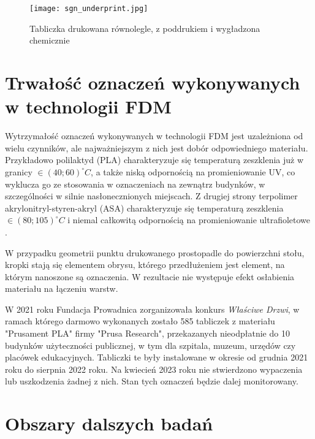 \documentclass[12pt,a4paper]{article}
\begin{document}
\begin{figure}
\texttt{[image: sgn\_underprint.jpg]}
\caption{Tabliczka drukowana równolegle, z poddrukiem i wygładzona chemicznie}
\end{figure}

\section{Trwałość oznaczeń wykonywanych w technologii FDM}
Wytrzymałość oznaczeń wykonywanych w technologii FDM jest uzależniona od wielu czynników, ale najważniejszym z nich jest dobór odpowiedniego materiału.
Przykładowo polilaktyd (PLA) charakteryzuje się temperaturą zeszklenia już w granicy $\in (40; 60)^{\circ} C$, a także niską odpornością na promieniowanie UV, co wyklucza go ze stosowania w oznaczeniach na zewnątrz budynków, w szczególności w silnie nasłonecznionych miejscach. Z drugiej strony terpolimer akrylonitryl-styren-akryl (ASA) charakteryzuje się temperaturą zeszklenia $\in (80; 105)^{\circ} C$ i niemal całkowitą odpornością na promieniowanie ultrafioletowe \cite{plaabsasa}.

W przypadku geometrii punktu drukowanego prostopadle do powierzchni stołu, kropki stają się elementem obrysu, którego przedłużeniem jest element, na którym nanoszone są oznaczenia. W rezultacie nie występuje efekt osłabienia materiału na łączeniu warstw.

W 2021 roku Fundacja Prowadnica zorganizowała konkurs \emph{Właściwe Drzwi}, w ramach którego darmowo wykonanych zostało 585 tabliczek z materiału "Prusament PLA" firmy "Prusa Research", przekazanych nieodpłatnie do 10 budynków użyteczności publicznej, w tym dla szpitala, muzeum, urzędów czy placówek edukacyjnych. Tabliczki te były instalowane w okresie od grudnia 2021 roku do sierpnia 2022 roku. Na kwiecień 2023 roku nie stwierdzono wypaczenia lub uszkodzenia żadnej z nich. Stan tych oznaczeń będzie dalej monitorowany.

\section{Obszary dalszych badań}
\end{document}
